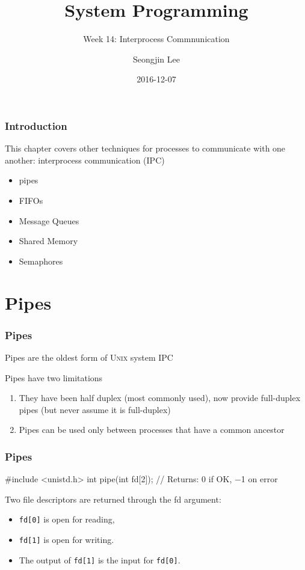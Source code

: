 \documentclass[newPxFont,sthlmFooter,nooffset]{beamer}
\title{System Programming}
\subtitle{Week 14: Interprocess Commnunication}
\author[SJL]{Seongjin Lee}
\institute{\href{mailto:insight@hanyang.ac.kr}{insight@hanyang.ac.kr}\\\url{http://esos.hanyang.ac.kr}\\Esos Lab. Hanyang University}
\date{2016-12-07}
\begin{document}
\frame[plain]{\titlepage} 






\begin{frame}[t]
  \frametitle{Introduction}



This chapter covers other techniques for processes to communicate with one another: interprocess communication (IPC)
\begin{itemize}
\item pipes
\item FIFOs
\item Message Queues
\item Shared Memory
\item Semaphores
\end{itemize}
\end{frame}

\section{Pipes}

\begin{frame}[t, fragile]
  \frametitle{Pipes}
Pipes are the oldest form of \textsc{Unix} system IPC 

Pipes have two limitations
\begin{enumerate}
\item They have been half duplex (most commonly used), now provide full-duplex pipes (but never assume it is full-duplex)
\item Pipes can be used only between processes that have a common ancestor
\end{enumerate}

\end{frame}


\begin{frame}[t, fragile]
  \frametitle{Pipes}
\begin{codedef}
#include <unistd.h>
int pipe(int fd[2]);
// Returns: 0 if OK, −1 on error 
\end{codedef}
Two file descriptors are returned through the fd argument:
\begin{itemize}
\item \texttt{fd[0]} is open for reading,
\item \texttt{fd[1]} is open for writing.
\item The output of \texttt{fd[1]} is the input for \texttt{fd[0]}.
\end{itemize}

\end{frame}
\end{document}
